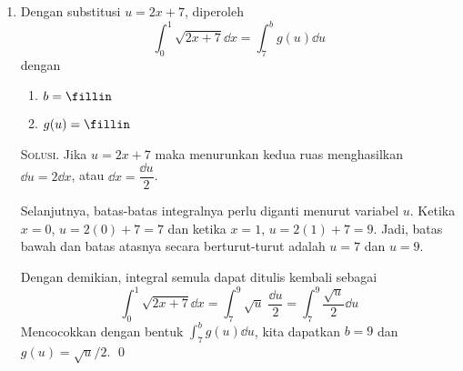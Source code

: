 \documentclass{exam}
\renewenvironment{proof}[1][Solusi.]{\ProofBox\strut\textsc{#1}\space}{\endProofBox}
\numberwithin{equation}{section}
\begin{document}
\begin{enumerate}
    \begin{proof}
        Integral tentu dari suatu fungsi merepresentasikan luas bertanda dari daerah yang berada di bawah grafik fungsi tersebut. Luasan di bawah sumbu-$x$ ($y$-nya negatif) bernilai negatif, sedangkan luasan di atas sumbu-$x$ bernilai positif. Jadi, $-\displaystyle \int_{1}^{2} f(x) \dd{x}$ dan $\displaystyle \int_{2}^{4} f(x) \dd{x}$ secara berturut-turut sama dengan luas dari $R_1$ dan $R_2$.
        \begin{enumerate}[label=(\alph*)]
            \item Berdasarkan sifat integral untuk batas bawah yang lebih besar dari batas atas integrasi, kita dapatkan $\displaystyle \int_{4}^{2} f(x) \dd{x} = -\int_{2}^{4} f(x) \dd{x} = -6$. \qed
            \item Berdasarkan sifat aditif untuk integral, kita dapatkan $\displaystyle \int_{1}^{4} f(x) \dd{x} = \int_{1}^{2} f(x) \dd{x} + \int_{2}^{4} f(x) \dd{x} = -1 + 6 = 5$. \qed
        \end{enumerate}
    \end{proof}\vspace{1em}
    
\item Dengan substitusi $u = 2x + 7$, diperoleh
\[\int_{0}^{1} \sqrt{2x + 7} \dd{x} = \int_{7}^{b} g(u) \dd{u}\]
dengan
\begin{enumerate}
    \item $b = \fillin $
    \item $g(u) = \fillin$
\end{enumerate}

\begin{proof}
        Jika $u = 2x + 7$ maka menurunkan kedua ruas menghasilkan $\dd{u} = 2 \dd{x}$, atau $\dd{x} = \dfrac{\dd{u}}{2}$. 
        
        \par Selanjutnya, batas-batas integralnya perlu diganti menurut variabel $u$. Ketika $x = 0$, $u = 2(0) + 7 = 7$ dan ketika $x = 1$, $u = 2(1) + 7 = 9$. Jadi, batas bawah dan batas atasnya secara berturut-turut adalah $u = 7$ dan $u = 9$. 
        
        
        \par Dengan demikian, integral semula dapat ditulis kembali sebagai
        \[\int_{0}^{1} \sqrt{2x + 7} \dd{x} = \int_{7}^{9} \sqrt{u} \; \frac{\dd{u}}{2} = \int_{7}^{9} \frac{\sqrt{u}}{2} \dd{u}\]
        Mencocokkan dengan bentuk $\displaystyle \int_{7}^{b} g(u) \dd{u}$, kita dapatkan $b = 9$ dan $g(u) = \sqrt{u}/2$. \qed
    \end{proof}\vspace{1em}


\end{enumerate}
\end{document}
